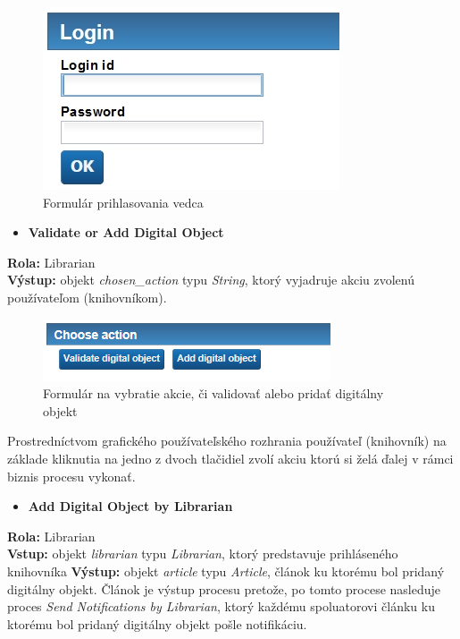 \documentclass[10pt,oneside,slovak,a4paper]{article}
\begin{document}
\begin{figure} [H]
\centering
\includegraphics[scale=0.7]{forms/formLogin.jpg} 
\caption{Formulár prihlasovania vedca}
\end{figure}

\begin{itemize}
\item \textbf{Validate or Add Digital Object}
\end{itemize}

\textbf{Rola:} Librarian\\
\textbf{Výstup:} objekt \textit{chosen\_action} typu \textit{String}, ktorý vyjadruje akciu zvolenú používateľom (knihovníkom).

\begin{figure} [H]
\centering
\includegraphics[scale=0.7]{forms/formChooseActionLib.png} 
\caption{Formulár na vybratie akcie, či validovať alebo pridať digitálny objekt}
\end{figure}

Prostredníctvom grafického používateľského rozhrania používateľ (knihovník) na základe kliknutia na jedno z dvoch tlačidiel zvolí akciu ktorú si želá ďalej v rámci biznis procesu vykonať.

\begin{itemize}
\item \textbf{Add Digital Object by Librarian}
\end{itemize}

\textbf{Rola:} Librarian\\
\textbf{Vstup:} objekt \textit{librarian} typu \textit{Librarian},  ktorý predstavuje prihláseného knihovníka
\textbf{Výstup:} objekt \textit{article} typu \textit{Article}, článok ku ktorému bol pridaný digitálny objekt. Článok je výstup procesu pretože, po tomto procese nasleduje proces \textit{Send Notifications by Librarian}, ktorý každému spoluatorovi článku ku ktorému bol pridaný digitálny objekt pošle notifikáciu.
\end{document}
